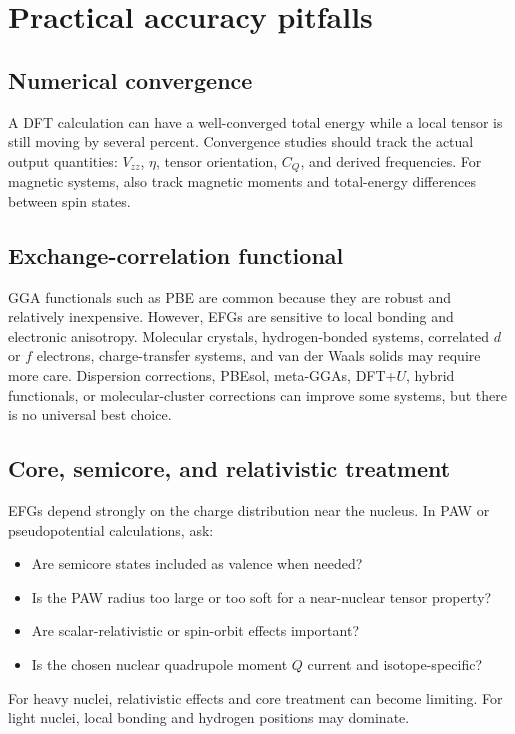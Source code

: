 \documentclass[11pt]{article}
\newcommand{\CQ}{C_Q}
\newcommand{\Vzz}{V_{zz}}
\newcommand{\etaEFG}{\eta}
\begin{document}
\section{Practical accuracy pitfalls}

\subsection{Numerical convergence}

A DFT calculation can have a well-converged total energy while a local tensor is still moving by several percent.  Convergence studies should track the actual output quantities: $\Vzz$, $\etaEFG$, tensor orientation, $\CQ$, and derived frequencies.  For magnetic systems, also track magnetic moments and total-energy differences between spin states.

\subsection{Exchange-correlation functional}

GGA functionals such as PBE are common because they are robust and relatively inexpensive.  However, EFGs are sensitive to local bonding and electronic anisotropy.  Molecular crystals, hydrogen-bonded systems, correlated $d$ or $f$ electrons, charge-transfer systems, and van der Waals solids may require more care.  Dispersion corrections, PBEsol, meta-GGAs, DFT+$U$, hybrid functionals, or molecular-cluster corrections can improve some systems, but there is no universal best choice.

\subsection{Core, semicore, and relativistic treatment}

EFGs depend strongly on the charge distribution near the nucleus.  In PAW or pseudopotential calculations, ask:
\begin{itemize}
\item Are semicore states included as valence when needed?
\item Is the PAW radius too large or too soft for a near-nuclear tensor property?
\item Are scalar-relativistic or spin-orbit effects important?
\item Is the chosen nuclear quadrupole moment $Q$ current and isotope-specific?
\end{itemize}
For heavy nuclei, relativistic effects and core treatment can become limiting.  For light nuclei, local bonding and hydrogen positions may dominate.
\end{document}
